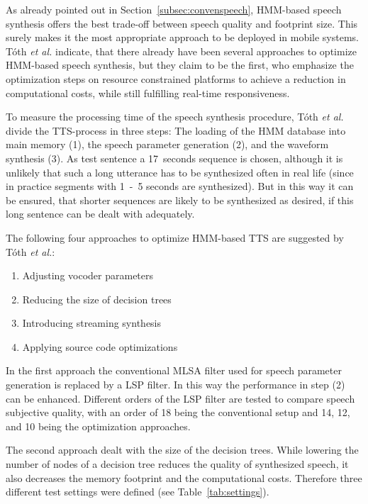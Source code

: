As already pointed out in Section~\ref{subsec:convenspeech}, \ac{HMM}-based speech synthesis offers the best trade-off between speech quality and footprint size. This surely makes it the most appropriate approach to be deployed in mobile systems. T\'oth \textit{et al.} indicate, that there already have been several approaches to optimize \ac{HMM}-based speech synthesis, but they claim to be the first, who emphasize the optimization steps on resource constrained platforms to achieve a reduction in computational costs, while still fulfilling real-time responsiveness.

To measure the processing time of the speech synthesis procedure, T\'oth \textit{et al.} divide the \ac{TTS}-process in three steps: The loading of the \ac{HMM} database
into main memory (1), the speech parameter generation (2), and the waveform synthesis (3). As test sentence a 17~seconds sequence is chosen, although it is unlikely that such a long utterance has to be synthesized often in real life (since in practice segments with 1~-~5 seconds are synthesized). But in this way it can be ensured, that shorter sequences are likely to be synthesized as desired, if this long sentence can be dealt with adequately.

The following four approaches to optimize \ac{HMM}-based \ac{TTS} are suggested by T\'oth \textit{et al.}:

\begin{enumerate}[label=\Alph*)]		%
	\parskip0.25em
	\bfseries
	\item Adjusting vocoder parameters
	\item Reducing the size of decision trees
	\item Introducing streaming synthesis
	\item Applying source code optimizations
\end{enumerate}

In the first approach the conventional \ac{MLSA} filter used for speech parameter generation is replaced by a \ac{LSP} filter. In this way the performance in step (2) can be enhanced. Different orders of the \ac{LSP} filter are tested to compare speech subjective quality, with an order of 18 being the conventional setup and 14, 12, and 10 being the optimization approaches.

The second approach dealt with the size of the decision trees. While lowering the number of nodes of a decision tree reduces the quality of synthesized speech, it also decreases the memory footprint and the computational costs. Therefore three different test settings were defined (see Table~\ref{tab:settings}).

